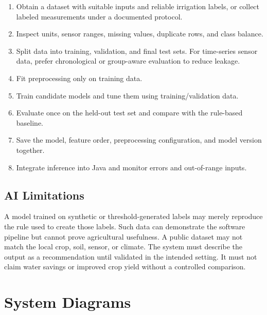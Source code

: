 \documentclass[12pt,a4paper]{report}
\begin{document}
\begin{enumerate}[leftmargin=*]

\item Obtain a dataset with suitable inputs and reliable irrigation labels, or collect labeled measurements under a documented protocol.

\item Inspect units, sensor ranges, missing values, duplicate rows, and class balance.

\item Split data into training, validation, and final test sets. For time-series sensor data, prefer chronological or group-aware evaluation to reduce leakage.

\item Fit preprocessing only on training data.

\item Train candidate models and tune them using training/validation data.

\item Evaluate once on the held-out test set and compare with the rule-based baseline.

\item Save the model, feature order, preprocessing configuration, and model version together.

\item Integrate inference into Java and monitor errors and out-of-range inputs.

\end{enumerate}

\section{AI Limitations}

A model trained on synthetic or threshold-generated labels may merely reproduce the rule used to create those labels. Such data can demonstrate the software pipeline but cannot prove agricultural usefulness. A public dataset may not match the local crop, soil, sensor, or climate. The system must describe the output as a recommendation until validated in the intended setting. It must not claim water savings or improved crop yield without a controlled comparison.

\chapter{System Diagrams}
\clearpage
\end{document}
